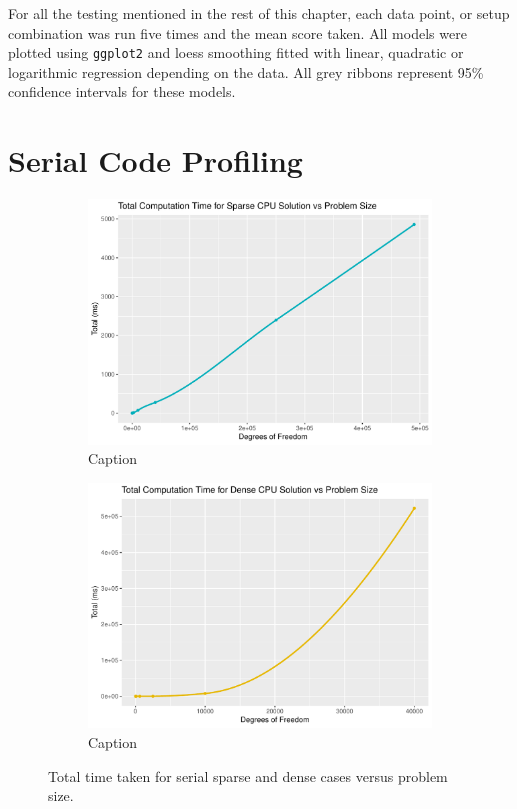 \begin{remark}
For all the testing mentioned in the rest of this chapter, each data point, or setup combination was run five times and the mean score taken. All models were plotted using \texttt{ggplot2} and loess smoothing fitted with linear, quadratic or logarithmic regression depending on the data. All grey ribbons represent 95\% confidence intervals for these models.
\end{remark}

\section{Serial Code Profiling}

\begin{figure}
	\centering
	\begin{subfigure}{0.48\linewidth}
		\centering
		\includegraphics[width = \linewidth]{Plots/total_sparse_cpu}
		\caption{Caption}
		\label{fig:tot_sparse_cpu}
	\end{subfigure}\hfill
	\begin{subfigure}{0.48\linewidth}
		\centering
		\includegraphics[width=\linewidth]{Plots/total_dense_cpu}
		\caption{Caption}
		\label{fig:tot_dense_cpu}
	\end{subfigure}
	\caption{Total time taken for serial sparse and dense cases versus problem size.}
	\label{fig:tot_cpu}
\end{figure}

